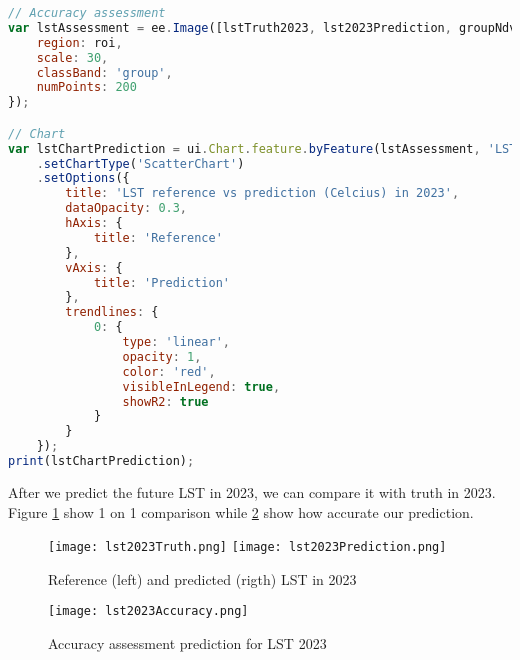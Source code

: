 \begin{lstlisting}[language=JavaScript, label={code:futureLst}, caption={GEE Script to predict future LST}]
// Accuracy assessment
var lstAssessment = ee.Image([lstTruth2023, lst2023Prediction, groupNdvi]).stratifiedSample({
	region: roi,
	scale: 30,
	classBand: 'group',
	numPoints: 200
});

// Chart
var lstChartPrediction = ui.Chart.feature.byFeature(lstAssessment, 'LST_truth_2023', ['LST_prediction_2023'])
	.setChartType('ScatterChart')
	.setOptions({
		title: 'LST reference vs prediction (Celcius) in 2023',
		dataOpacity: 0.3,
		hAxis: {
			title: 'Reference'
		},
		vAxis: {
			title: 'Prediction'
		},
		trendlines: {
			0: {
				type: 'linear',
				opacity: 1,
				color: 'red',
				visibleInLegend: true,
				showR2: true
			}
		}
	});
print(lstChartPrediction);
\end{lstlisting}
	
	After we predict the future LST in 2023, we can compare it with truth in 2023. Figure \ref{fig:lst2023} show 1 on 1 comparison while \ref{fig:r22023} show how accurate our prediction.
	
\begin{figure}[htbp]
	\label{fig:lst2023}
	\centering
	\texttt{[image: lst2023Truth.png]}
	\texttt{[image: lst2023Prediction.png]}
	\caption{Reference (left) and predicted (rigth) LST in 2023}
\end{figure}

\begin{figure}[htbp]
	\label{fig:r22023}
	\centering
	\texttt{[image: lst2023Accuracy.png]}
	\caption{Accuracy assessment prediction for LST 2023}
\end{figure}
\printbibliography